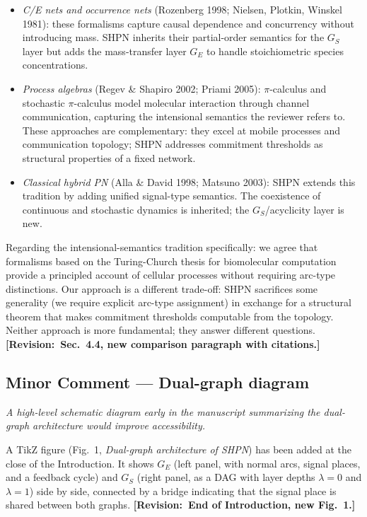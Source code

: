 \documentclass[11pt,letterpaper]{article}
\newcommand{\rquote}[1]{\begin{mdframed}[style=reviewquote]\textit{#1}\end{mdframed}}
\newcommand{\sref}[1]{\textbf{[Revision:~#1]}}
\begin{document}
\begin{itemize}
\item \emph{C/E nets and occurrence nets} (Rozenberg 1998; Nielsen, Plotkin,
  Winskel 1981): these formalisms capture causal dependence and concurrency
  without introducing mass. SHPN inherits their partial-order semantics for the
  $G_S$ layer but adds the mass-transfer layer $G_E$ to handle stoichiometric
  species concentrations.
\item \emph{Process algebras} (Regev \& Shapiro 2002; Priami 2005): $\pi$-calculus
  and stochastic $\pi$-calculus model molecular interaction through channel
  communication, capturing the intensional semantics the reviewer refers to.
  These approaches are complementary: they excel at mobile processes and
  communication topology; SHPN addresses commitment thresholds as structural
  properties of a fixed network.
\item \emph{Classical hybrid PN} (Alla \& David 1998; Matsuno 2003): SHPN
  extends this tradition by adding unified signal-type semantics. The
  coexistence of continuous and stochastic dynamics is inherited; the
  $G_S$/acyclicity layer is new.
\end{itemize}

Regarding the intensional-semantics tradition specifically: we agree that
formalisms based on the Turing-Church thesis for biomolecular computation
provide a principled account of cellular processes without requiring arc-type
distinctions. Our approach is a different trade-off: SHPN sacrifices some
generality (we require explicit arc-type assignment) in exchange for a
structural theorem that makes commitment thresholds computable from the
topology. Neither approach is more fundamental; they answer different questions.
\sref{Sec.~4.4, new comparison paragraph with citations.}

\subsection*{Minor Comment --- Dual-graph diagram}

\rquote{A high-level schematic diagram early in the manuscript summarizing the
dual-graph architecture would improve accessibility.}

A TikZ figure (Fig.~1, \textit{Dual-graph architecture of SHPN}) has been
added at the close of the Introduction. It shows $G_E$ (left panel, with normal
arcs, signal places, and a feedback cycle) and $G_S$ (right panel, as a DAG
with layer depths $\lambda = 0$ and $\lambda = 1$) side by side, connected by
a bridge indicating that the signal place is shared between both graphs.
\sref{End of Introduction, new Fig.~1.}
\end{document}
